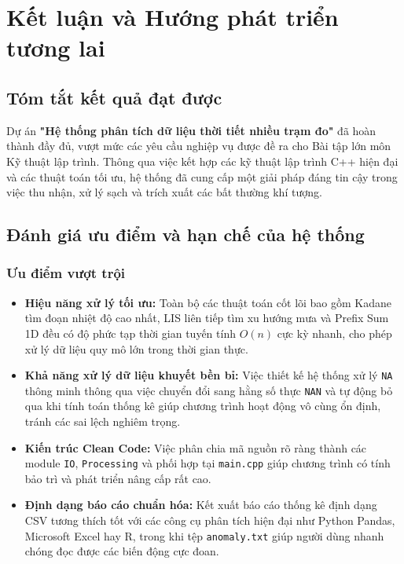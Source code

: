 \section{Kết luận và Hướng phát triển tương lai}

\subsection{Tóm tắt kết quả đạt được}
Dự án \textbf{"Hệ thống phân tích dữ liệu thời tiết nhiều trạm đo"} đã hoàn thành đầy đủ, vượt mức các yêu cầu nghiệp vụ được đề ra cho Bài tập lớn môn Kỹ thuật lập trình. Thông qua việc kết hợp các kỹ thuật lập trình C++ hiện đại và các thuật toán tối ưu, hệ thống đã cung cấp một giải pháp đáng tin cậy trong việc thu nhận, xử lý sạch và trích xuất các bất thường khí tượng.

\subsection{Đánh giá ưu điểm và hạn chế của hệ thống}

\subsubsection{Ưu điểm vượt trội}
\begin{itemize}
    \item \textbf{Hiệu năng xử lý tối ưu:} Toàn bộ các thuật toán cốt lõi bao gồm Kadane tìm đoạn nhiệt độ cao nhất, LIS liên tiếp tìm xu hướng mưa và Prefix Sum 1D đều có độ phức tạp thời gian tuyến tính $O(n)$ cực kỳ nhanh, cho phép xử lý dữ liệu quy mô lớn trong thời gian thực.
    \item \textbf{Khả năng xử lý dữ liệu khuyết bền bỉ:} Việc thiết kế hệ thống xử lý \texttt{NA} thông minh thông qua việc chuyển đổi sang hằng số thực \texttt{NAN} và tự động bỏ qua khi tính toán thống kê giúp chương trình hoạt động vô cùng ổn định, tránh các sai lệch nghiêm trọng.
    \item \textbf{Kiến trúc Clean Code:} Việc phân chia mã nguồn rõ ràng thành các module \texttt{IO}, \texttt{Processing} và phối hợp tại \texttt{main.cpp} giúp chương trình có tính bảo trì và phát triển nâng cấp rất cao.
    \item \textbf{Định dạng báo cáo chuẩn hóa:} Kết xuất báo cáo thống kê định dạng CSV tương thích tốt với các công cụ phân tích hiện đại như Python Pandas, Microsoft Excel hay R, trong khi tệp \texttt{anomaly.txt} giúp người dùng nhanh chóng đọc được các biến động cực đoan.
\end{itemize}

